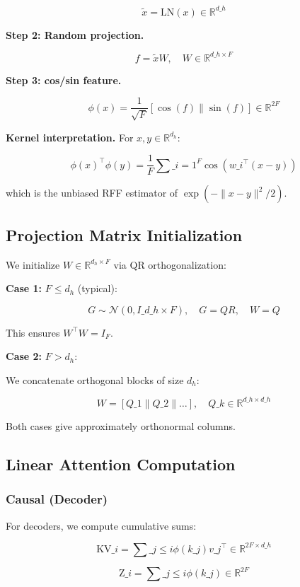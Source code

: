 \[
\tilde{x} = \text{LN}(x) \in \mathbb{R}^{d\_h}
\tag{4.1}
\]

\textbf{Step 2: Random projection.}

\[
f = \tilde{x} W, \quad W \in \mathbb{R}^{d\_h \times F}
\tag{4.2}
\]

\textbf{Step 3: cos/sin feature.}

\[
\phi(x) = \frac{1}{\sqrt{F}} [\cos(f) \| \sin(f)] \in \mathbb{R}^{2F}
\tag{4.3}
\]

\textbf{Kernel interpretation.} For $x, y \in \mathbb{R}^{d_h}$:

\[
\phi(x)^\top \phi(y) = \frac{1}{F} \sum\_{i=1}^F \cos(w\_i^\top (x - y))
\tag{4.4}
\]

which is the unbiased RFF estimator of $\exp(-\|x - y\|^2 / 2)$.

\subsection{Projection Matrix Initialization}

We initialize $W \in \mathbb{R}^{d_h \times F}$ via QR orthogonalization:

\textbf{Case 1:} $F \leq d_h$ (typical):

\[
G \sim \mathcal{N}(0, I\_{d\_h \times F}), \quad G = Q R, \quad W = Q
\tag{4.5}
\]

This ensures $W^\top W = I_F$.

\textbf{Case 2:} $F > d_h$:

We concatenate orthogonal blocks of size $d_h$:

\[
W = [Q\_1 \| Q\_2 \| \dots], \quad Q\_k \in \mathbb{R}^{d\_h \times d\_h}
\tag{4.6}
\]

Both cases give approximately orthonormal columns.

\subsection{Linear Attention Computation}

\subsubsection{Causal (Decoder)}

For decoders, we compute cumulative sums:

\[
\text{KV}\_i = \sum\_{j \leq i} \phi(k\_j) v\_j^\top \in \mathbb{R}^{2F \times d\_h}
\tag{4.7}
\]

\[
\text{Z}\_i = \sum\_{j \leq i} \phi(k\_j) \in \mathbb{R}^{2F}
\tag{4.8}
\]

